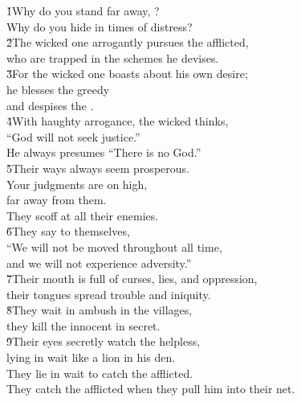 \begin{poetry}
\poeml \v{1}Why do you stand far away, ? \\
\poemll    Why do you hide in times of distress? \\
\poeml \v{2}The wicked one arrogantly pursues the afflicted, \\
\poemll    who are trapped in the schemes he devises. \\
\poeml \v{3}For the wicked one boasts about his own desire; \\
\poemll    he blesses the greedy \\
\poemlll       and despises the . \\
\poeml \v{4}With haughty arrogance, the wicked thinks, \\
\poemll    ``God will not seek justice.'' \\
\poemlll       He always presumes ``There is no God.'' \\
\poeml \v{5}Their ways always seem prosperous. \\
\poeml Your judgments are on high, \\
\poemlll       far away from them. \\
\poeml They scoff at all their enemies. \\
\poeml \v{6}They say to themselves, \\
\poemll    ``We will not be moved throughout all time, \\
\poemlll       and we will not experience adversity.'' \\
\poeml \v{7}Their mouth is full of curses, lies, and oppression, \\
\poemll    their tongues spread trouble and iniquity. \\
\poeml \v{8}They wait in ambush in the villages, \\
\poemll    they kill the innocent in secret. \\
\poeml \v{9}Their eyes secretly watch the helpless, \\
\poemll    lying in wait like a lion in his den. \\
\poeml They lie in wait to catch the afflicted. \\
\poemll    They catch the afflicted when they pull him into their net. \\

\end{poetry}
